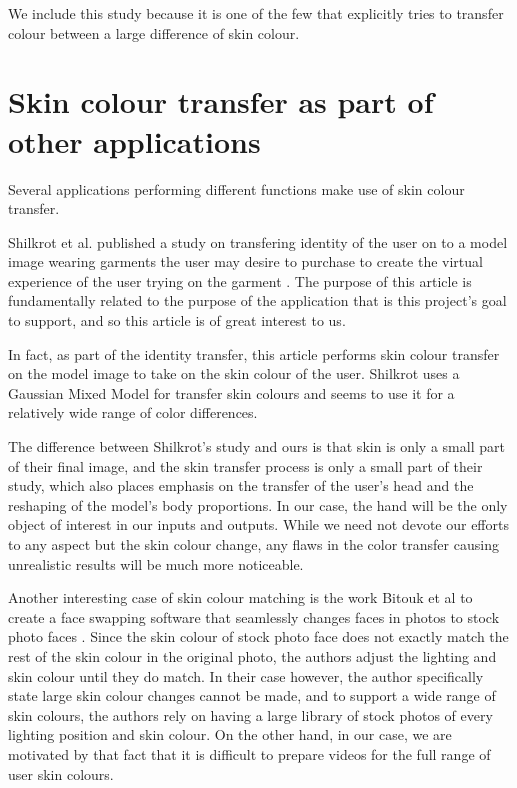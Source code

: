 We include this study because it is one of the few that explicitly tries to transfer colour between a large difference of skin colour.

\section{Skin colour transfer as part of other applications}
Several applications performing different functions make use of skin colour transfer.

Shilkrot et al. published a study on transfering identity of the user on to a model image wearing garments the user may desire to purchase to create the virtual experience of the user trying on the garment \cite{shilkrot_2013_garment}. The purpose of this article is fundamentally related to the purpose of the application that is this project's goal to support, and so this article is of great interest to us. 

In fact, as part of the identity transfer, this article performs skin colour transfer on the model image to take on the skin colour of the user. Shilkrot uses a Gaussian Mixed Model for transfer skin colours and seems to use it for a relatively wide range of color differences.

The difference between Shilkrot's study and ours is that skin is only a small part of their final image, and the skin transfer process is only a small part of their study, which also places emphasis on the transfer of the user's head and the reshaping of the model's body proportions. In our case, the hand will be the only object of interest in our inputs and outputs. While we need not devote our efforts to any aspect but the skin colour change, any flaws in the color transfer causing unrealistic results will be much more noticeable. 

Another interesting case of skin colour matching is the work Bitouk et al to create a face swapping software that seamlessly changes faces in photos to stock photo faces \cite{bitouk_2008_faceswap}. Since the skin colour of stock photo face does not exactly match the rest of the skin colour in the original photo, the authors adjust the lighting and skin colour until they do match. In their case however, the author specifically state large skin colour changes cannot be made, and to support a wide range of skin colours, the authors rely on having a large library of stock photos of every lighting position and skin colour. On the other hand, in our case, we are motivated by that fact that it is difficult to prepare videos for the full range of user skin colours.

